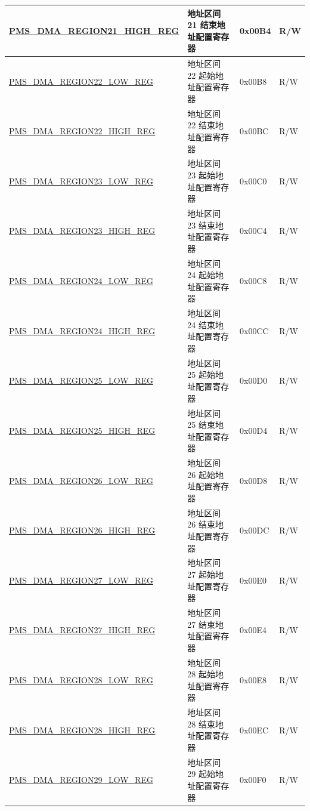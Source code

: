 \begin{longtable}{ | L{7.5cm} | L{6cm} | L{1.3cm} | L{1cm} | }
\hyperref[regdesc:PMSDMAREGIONNHIGHREG]{PMS\_DMA\_REGION21\_HIGH\_REG} & 地址区间 21 结束地址配置寄存器 & 0x00B4 & R/W \\ \hline
\hyperref[regdesc:PMSDMAREGIONNLOWREG]{PMS\_DMA\_REGION22\_LOW\_REG} & 地址区间 22 起始地址配置寄存器 & 0x00B8 & R/W \\ \hline
\hyperref[regdesc:PMSDMAREGIONNHIGHREG]{PMS\_DMA\_REGION22\_HIGH\_REG} & 地址区间 22 结束地址配置寄存器 & 0x00BC & R/W \\ \hline
\hyperref[regdesc:PMSDMAREGIONNLOWREG]{PMS\_DMA\_REGION23\_LOW\_REG} & 地址区间 23 起始地址配置寄存器 & 0x00C0 & R/W \\ \hline
\hyperref[regdesc:PMSDMAREGIONNHIGHREG]{PMS\_DMA\_REGION23\_HIGH\_REG} & 地址区间 23 结束地址配置寄存器 & 0x00C4 & R/W \\ \hline
\hyperref[regdesc:PMSDMAREGIONNLOWREG]{PMS\_DMA\_REGION24\_LOW\_REG} & 地址区间 24 起始地址配置寄存器 & 0x00C8 & R/W \\ \hline
\hyperref[regdesc:PMSDMAREGIONNHIGHREG]{PMS\_DMA\_REGION24\_HIGH\_REG} & 地址区间 24 结束地址配置寄存器 & 0x00CC & R/W \\ \hline
\hyperref[regdesc:PMSDMAREGIONNLOWREG]{PMS\_DMA\_REGION25\_LOW\_REG} & 地址区间 25 起始地址配置寄存器 & 0x00D0 & R/W \\ \hline
\hyperref[regdesc:PMSDMAREGIONNHIGHREG]{PMS\_DMA\_REGION25\_HIGH\_REG} & 地址区间 25 结束地址配置寄存器 & 0x00D4 & R/W \\ \hline
\hyperref[regdesc:PMSDMAREGIONNLOWREG]{PMS\_DMA\_REGION26\_LOW\_REG} & 地址区间 26 起始地址配置寄存器 & 0x00D8 & R/W \\ \hline
\hyperref[regdesc:PMSDMAREGIONNHIGHREG]{PMS\_DMA\_REGION26\_HIGH\_REG} & 地址区间 26 结束地址配置寄存器 & 0x00DC & R/W \\ \hline
\hyperref[regdesc:PMSDMAREGIONNLOWREG]{PMS\_DMA\_REGION27\_LOW\_REG} & 地址区间 27 起始地址配置寄存器 & 0x00E0 & R/W \\ \hline
\hyperref[regdesc:PMSDMAREGIONNHIGHREG]{PMS\_DMA\_REGION27\_HIGH\_REG} & 地址区间 27 结束地址配置寄存器 & 0x00E4 & R/W \\ \hline
\hyperref[regdesc:PMSDMAREGIONNLOWREG]{PMS\_DMA\_REGION28\_LOW\_REG} & 地址区间 28 起始地址配置寄存器 & 0x00E8 & R/W \\ \hline
\hyperref[regdesc:PMSDMAREGIONNHIGHREG]{PMS\_DMA\_REGION28\_HIGH\_REG} & 地址区间 28 结束地址配置寄存器 & 0x00EC & R/W \\ \hline
\hyperref[regdesc:PMSDMAREGIONNLOWREG]{PMS\_DMA\_REGION29\_LOW\_REG} & 地址区间 29 起始地址配置寄存器 & 0x00F0 & R/W \\ \hline

\end{longtable}
